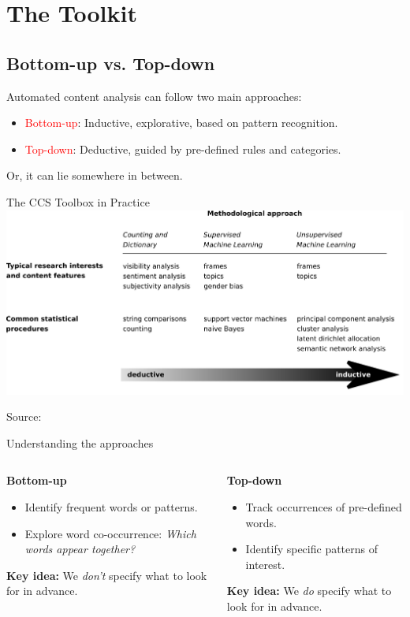 \documentclass[handout]{beamer}
\begin{document}
\section{The Toolkit}

\subsection{Bottom-up vs. Top-down}

\begin{frame}[standout]
Automated content analysis can follow two main approaches:
\begin{itemize}
\item \textcolor{red}{Bottom-up}: Inductive, explorative, based on pattern recognition.
\item \textcolor{red}{Top-down}: Deductive, guided by pre-defined rules and categories.
\end{itemize}
Or, it can lie somewhere in between.
\end{frame}

\begin{frame}{The CCS Toolbox in Practice}
\centering
\includegraphics[width=0.9\columnwidth]{../pictures/boumanstrilling2016}

\vspace{0.5cm}
\small{Source: \cite{Boumans2016}}
\end{frame}

\begin{frame}{Understanding the approaches}
\begin{columns}
\begin{block}{\textbf{Bottom-up}}
\begin{itemize}
\item Identify frequent words or patterns.
\item Explore word co-occurrence: \emph{Which words appear together?}
\end{itemize}
\textbf{Key idea:} We \emph{don't} specify what to look for in advance.
\end{block}

\begin{block}{\textbf{Top-down}}
\begin{itemize}
\item Track occurrences of pre-defined words.
\item Identify specific patterns of interest.
\end{itemize}
\textbf{Key idea:} We \emph{do} specify what to look for in advance.
\end{block}
\end{columns}
\end{frame}
\end{document}

